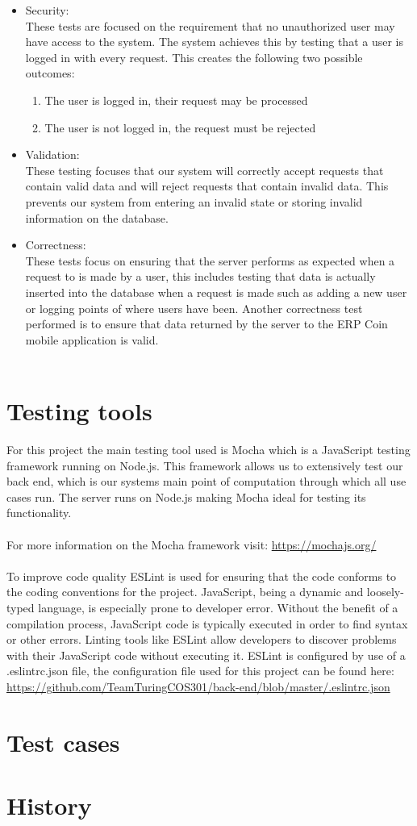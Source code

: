 \documentclass{article}
\begin{document}
\begin{itemize}
\item Security: \\
These tests are focused on the requirement that no unauthorized user may have access to the system. The system achieves this by testing that a user is logged in with every request. This creates the following two possible outcomes:
\begin{enumerate}
    \item The user is logged in, their request may be processed
    \item The user is not logged in, the request must be rejected
\end{enumerate}

\item Validation:\\
These testing focuses that our system will correctly accept requests that contain valid data and will reject requests that contain invalid data. This prevents our system from entering an invalid state or storing invalid information on the database. 

\item Correctness:\\
These tests focus on ensuring that the server performs as expected when a request to is made by a user, this includes testing that data is actually inserted into the database when a request is made such as adding a new user or logging points of where users have been. Another correctness test performed is to ensure that data returned by the server to the ERP Coin mobile application is valid.
\\ \\
\end{itemize}

\section{Testing tools}
For this project the main testing tool used is Mocha which is a JavaScript testing framework running on Node.js. This framework allows us to extensively test our back end, which is our systems main point of computation through which all use cases run. The server runs on Node.js making Mocha ideal for testing its functionality.
\\ \\
For more information on the Mocha framework visit:
\url{https://mochajs.org/}
\\\\
To improve code quality ESLint is used for ensuring that the code conforms to the coding conventions for the project. JavaScript, being a dynamic and loosely-typed language, is especially prone to developer error. Without the benefit of a compilation process, JavaScript code is typically executed in order to find syntax or other errors. Linting tools like ESLint allow developers to discover problems with their JavaScript code without executing it. ESLint is configured by use of a .eslintrc.json file,  the configuration file used for this project can be found here: \url{https://github.com/TeamTuringCOS301/back-end/blob/master/.eslintrc.json}

\section{Test cases}

\section{History}
\end{document}
